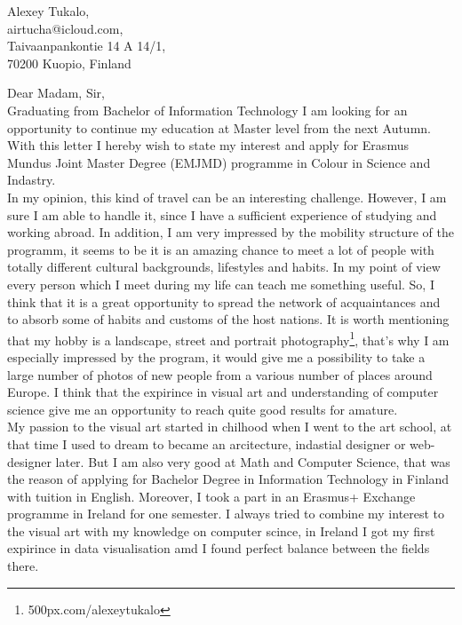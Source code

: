 \documentclass[english]{article}
\date{}
\begin{document}
\begin{flushright}
Alexey Tukalo,\\
airtucha@icloud.com,\\
Taivaanpankontie 14 A 14/1,\\
70200 Kuopio, Finland
\end{flushright}

Dear Madam, Sir,\\ 

Graduating from Bachelor of Information Technology I am looking for an opportunity to continue my education at Master level from the next Autumn. With this letter I hereby wish to state my interest and apply for Erasmus Mundus Joint Master Degree (EMJMD) programme in Colour in Science and Indastry.\\

In my opinion, this kind of travel can be an interesting challenge. However, I am sure I am able to handle it, since I have a sufficient experience of studying and working abroad. In addition, I am very impressed by the mobility structure of the programm, it seems to be it is an amazing chance to meet a lot of people with totally different cultural backgrounds, lifestyles and habits. In my point of view every person which I meet during my life can teach me something useful. So, I think that it is a great opportunity to spread the network of acquaintances and to absorb some of habits and customs of the host nations. It is worth mentioning that my hobby is a landscape, street and portrait photography\footnote{500px.com/alexeytukalo}, that’s why I am especially impressed by the program, it would give me a possibility to take a large number of photos of new people from a various number of places around Europe. I think that the expirince in visual art and understanding of computer science give me an opportunity to reach quite good results for amature.\\

My passion to the visual art started in chilhood when I went to the art school, at that time I used to dream to became an arcitecture, indastial designer or web-designer later. But I am also very good at Math and Computer Science, that was the reason of applying for Bachelor Degree in Information Technology in Finland with tuition in English. Moreover, I took a part in an Erasmus+ Exchange programme in Ireland for one semester. I always tried to combine my interest to the visual art with my knowledge on computer scince, in Ireland I got my first expirince in data visualisation amd I found perfect balance between the fields there.\\
\end{document}
